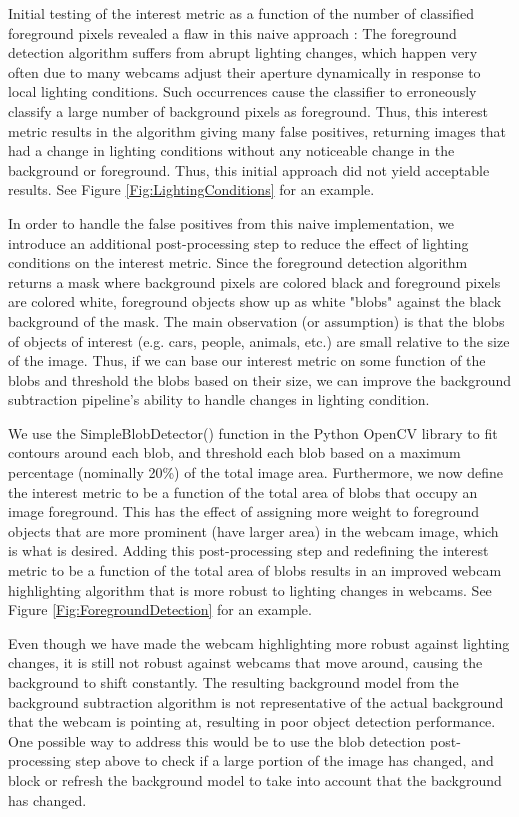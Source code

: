 \documentclass{article}
\begin{document}
Initial testing of the interest metric as a function of the number of
classified foreground pixels revealed a flaw in this naive approach : The
foreground detection algorithm suffers from abrupt lighting changes, which
happen very often due to many webcams adjust their aperture dynamically in
response to local lighting conditions. Such occurrences cause the classifier to
erroneously classify a large number of background pixels as foreground. Thus,
this interest metric results in the algorithm giving many false positives,
returning images that had a change in lighting conditions without any
noticeable change in the background or foreground. Thus, this initial approach
did not yield acceptable results. See Figure \ref{Fig:LightingConditions} for
an example.

In order to handle the false positives from this naive implementation, we
introduce an additional post-processing step to reduce the effect of lighting
conditions on the interest metric. Since the foreground detection algorithm
returns a mask where background pixels are colored black and foreground pixels
are colored white, foreground objects show up as white "blobs" against the
black background of the mask. The main observation (or assumption) is that the
blobs of objects of interest (e.g. cars, people, animals, etc.) are small
relative to the size of the image. Thus, if we can base our interest metric on
some function of the blobs and threshold the blobs based on their size, we can
improve the background subtraction pipeline's ability to handle changes in
lighting condition.

We use the SimpleBlobDetector() function in the Python OpenCV library to fit
contours around each blob, and threshold each blob based on a maximum
percentage (nominally 20\%) of the total image area. Furthermore, we now define
the interest metric to be a function of the total area of blobs that occupy an
image foreground. This has the effect of assigning more weight to foreground
objects that are more prominent (have larger area) in the webcam image, which
is what is desired. Adding this post-processing step and redefining the
interest metric to be a function of the total area of blobs results in an
improved webcam highlighting algorithm that is more robust to lighting changes
in webcams. See Figure \ref{Fig:ForegroundDetection} for an example.

Even though we have made the webcam highlighting more robust against lighting
changes, it is still not robust against webcams that move around, causing the
background to shift constantly. The resulting background model from the
background subtraction algorithm is not representative of the actual background
that the webcam is pointing at, resulting in poor object detection performance.
One possible way to address this would be to use the blob detection
post-processing step above to check if a large portion of the image has
changed, and block or refresh the background model to take into account that
the background has changed.
\end{document}
